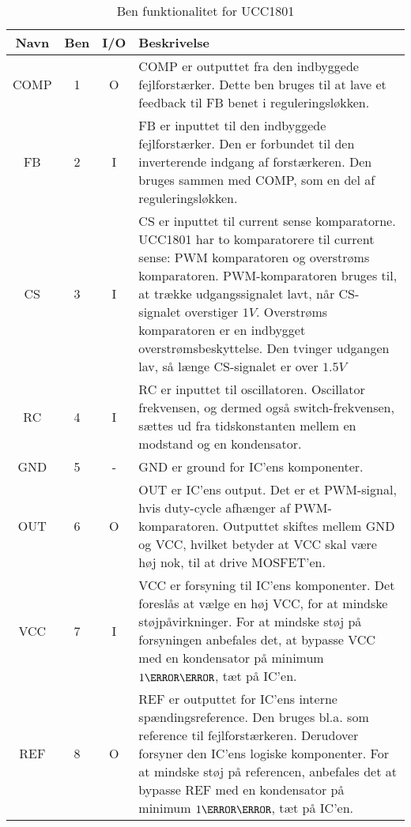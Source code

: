 \begin{table}[H] 			
	\centering
	\begin{tabularx}{\textwidth}{|c|c|c|X|} 
		\hline
		\textbf{Navn} & \textbf{Ben} & \textbf{I/O} & \textbf{Beskrivelse} \\ \hline
		COMP & 1 & O & COMP er outputtet fra den indbyggede fejlforstærker. Dette ben bruges til at lave et feedback til FB benet i reguleringsløkken. 	\\ \hline
		FB 	 & 2 & I & FB er inputtet til den indbyggede fejlforstærker. Den er forbundet til den inverterende indgang af forstærkeren. Den bruges sammen med COMP, som en del af reguleringsløkken.\\ \hline
		CS   & 3 & I & CS er inputtet til current sense komparatorne. UCC1801 har to komparatorere til current sense: PWM komparatoren og overstrøms komparatoren. PWM-komparatoren bruges til, at trække udgangssignalet lavt, når CS-signalet overstiger $1V$. Overstrøms komparatoren er en indbygget overstrømsbeskyttelse. Den tvinger udgangen lav, så længe CS-signalet er over $1.5V$ \\ \hline
		RC 	 & 4 & I & RC er inputtet til oscillatoren. Oscillator frekvensen, og dermed også switch-frekvensen, sættes ud fra tidskonstanten mellem en modstand og en kondensator.  \\ \hline
		GND  & 5 & - & GND er ground for IC'ens komponenter.  \\ \hline
		OUT  & 6 & O & OUT er IC'ens output. Det er et PWM-signal, hvis duty-cycle afhænger af PWM-komparatoren. Outputtet skiftes mellem GND og VCC, hvilket betyder at VCC skal være høj nok, til at drive MOSFET'en.  \\ \hline
		VCC  & 7 & I & VCC er forsyning til IC'ens komponenter. Det foreslås at vælge en høj VCC, for at mindske støjpåvirkninger. For at mindske støj på forsyningen anbefales det, at bypasse VCC med en kondensator på minimum $1\micro \farad$, tæt på IC'en. \\ \hline
		REF  & 8 & O & REF er outputtet for IC'ens interne spændingsreference. Den bruges bl.a. som reference til fejlforstærkeren. Derudover forsyner den IC'ens logiske komponenter. For at mindske støj på referencen, anbefales det at bypasse REF med en kondensator på minimum $1\micro \farad$, tæt på IC'en. \\ \hline
	\end{tabularx}
	
	\caption{Ben funktionalitet for UCC1801}
	\label{tab:ucc1801_pin_functionality}
\end{table}

